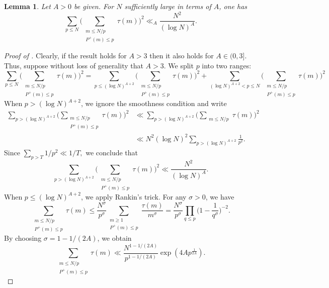 \documentclass[12pt]{amsart}
\renewcommand{\le}{\leqslant}
\renewcommand{\leq}{\leqslant}
\renewcommand{\geq}{\geqslant}
\numberwithin{equation}{section}
\theoremstyle{plain}
\newtheorem{lem}[thm]{Lemma}
\theoremstyle{definition}
\begin{document}
	\begin{lem}\label{lem: smooth divisor sums}
		Let $A > 0$ be given. For $N$ sufficiently large in terms of $A$, one has $$\sum_{p \leq N} \bigg(\sum_{\substack{m \leq N/p \\ P^+(m) \leq p}} \tau(m)\bigg)^2 \ll_A \frac{N^2}{(\log N)^A}.$$
	\end{lem}
	\begin{proof}[Proof of ]
		Clearly, if the result holds for $A > 3$ then it also holds for $A \in (0,3]$. Thus, suppose without loss of generality that $A > 3$. We split $p$ into two ranges:
		\begin{equation}\label{eq:smooth divisor sums 1}\sum_{p \leq N} \bigg(\sum_{\substack{m \leq N/p \\ P^+(m) \leq p}} \tau(m)\bigg)^2 = \sum_{p \leq (\log N)^{A+2}} \bigg(\sum_{\substack{m \leq N/p \\ P^+(m) \leq p}} \tau(m)\bigg)^2+\sum_{(\log N)^{A+2} < p \leq N} \bigg(\sum_{\substack{m \leq N/p \\ P^+(m) \leq p}} \tau(m)\bigg)^2
		\end{equation}
		When $p > (\log N)^{A+2}$, we ignore the smoothness condition and write
		\begin{align*}
			\sum_{p > (\log N)^{A+2}} \bigg(\sum_{\substack{m \leq N/p \\ P^+(m) \leq p}} \tau(m)\bigg)^2 &\ll \sum_{p > (\log N)^{A+2}} \bigg(\sum_{\substack{m \leq N/p}} \tau(m)\bigg)^2\\
			&\ll N^2 (\log N)^2 \sum_{p > (\log N)^{A+2}} \frac{1}{p^2} .
		\end{align*} 
		Since $\sum_{p > T}1/p^2 \ll 1/T,$ we conclude that
		\begin{equation}\label{eq:smooth divisor sums 2}
			\sum_{p >(\log N)^{A+2}} \bigg(\sum_{\substack{m \leq N/p \\ P^+(m) \leq p}} \tau(m)\bigg)^2 \ll \frac{N^2}{(\log N)^A}.
		\end{equation}
		When $p \le (\log N)^{A+2}$, we apply Rankin's trick. For any $\sigma > 0$, we have
		$$\sum_{\substack{m \leq N/p \\ P^+(m) \leq p}} \tau(m) \leq \frac{N^\sigma}{p^\sigma} \sum_{\substack{m \geq 1 \\ P^+(m) \leq p}} \frac{\tau(m)}{m^\sigma} = \frac{N^\sigma}{p^\sigma} \prod_{q \leq p}\bigg(1-\frac{1}{q^\sigma}\bigg)^{-2}. $$
		By choosing $\sigma = 1-1/(2A)$, we obtain
		$$\sum_{\substack{m \leq N/p \\ P^+(m) \leq p}} \tau(m) \ll \frac{N^{1-1/(2A)}}{p^{1-1/(2A)}} \exp(4Ap^{\frac{1}{2A}}).$$

\end{proof}
\end{document}
